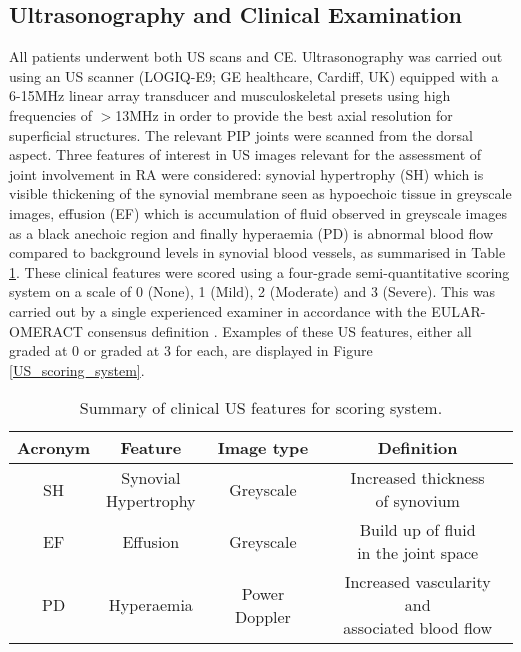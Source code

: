 \documentclass[twoside]{bhamthesis}
\theoremstyle{definition}
\begin{document}
\egroup

\subsection{Ultrasonography and Clinical Examination}

All patients underwent both US scans and CE. Ultrasonography was carried out using an US scanner (LOGIQ-E9; GE healthcare, Cardiff, UK) equipped with a 6-15MHz linear array transducer and musculoskeletal presets using high frequencies of $>$13MHz in order to  provide the best axial resolution for superficial structures. The relevant PIP joints were scanned from the dorsal aspect. Three features of interest in US images relevant for the assessment of joint involvement in RA were considered: synovial hypertrophy (SH) which is visible thickening of the synovial membrane seen as hypoechoic tissue in greyscale images, effusion (EF) which is accumulation of fluid observed in greyscale images as a black anechoic region and finally hyperaemia (PD) is abnormal blood flow compared to background levels in synovial blood vessels, as summarised in Table \ref{tab:USfeaturestable}. These clinical features were scored using a four-grade semi-quantitative scoring system on a scale of 0 (None), 1 (Mild), 2 (Moderate) and 3 (Severe). This was carried out by a single experienced examiner in accordance with the EULAR-OMERACT
consensus definition \cite{terslev2017scoring,d2017scoring}. Examples of these US features, either all graded at 0 or graded at 3 for each, are displayed in Figure \ref{US_scoring_system}.
 
\bgroup
\def\arraystretch{1.2}
\begin{table}[!ht]
\begin{center}
 \begin{tabular}{c c c c}
 \hline
 \textbf{Acronym} & \textbf{Feature} & \textbf{Image type} & \textbf{Definition} \\ [1.5ex] 
 \hline
 SH & \thead{Synovial \\ Hypertrophy} & Greyscale & \thead{Increased thickness \\ of synovium}\\ 
 EF & Effusion & Greyscale &  \thead{Build up of fluid \\ in the joint space}\\
 PD & Hyperaemia & Power Doppler & \thead{Increased vascularity and \\ associated blood flow}\\
  \hline
\end{tabular}
\caption{Summary of clinical US features for scoring system.}
\label{tab:USfeaturestable}
\end{center}
\end{table}
\egroup
\end{document}
